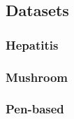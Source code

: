 \subsection{Datasets}
\subsubsection{Hepatitis}


\subsubsection{Mushroom}

\subsubsection{Pen-based}
